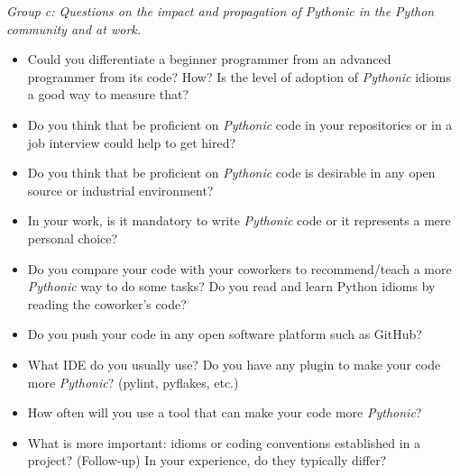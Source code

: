 \documentclass[a4paper]{article}
\begin{document}
\begin{appendices}
\textit{Group c: Questions on the impact and propagation of \textit{Pythonic} in the Python community and at work.}
\begin{itemize}
  \item Could you differentiate a beginner programmer from an advanced programmer from its code? How? Is the level of adoption of \textit{Pythonic} idioms a good way to measure that?
  \item Do you think that be proficient on \textit{Pythonic} code in your repositories or in a job interview could help to get hired?
  \item Do you think that be proficient on \textit{Pythonic} code is desirable in any open source or industrial environment?
  \item In your work, is it mandatory to write \textit{Pythonic} code or it represents a mere personal choice?
  \item Do you compare your code with your coworkers to recommend/teach a more \textit{Pythonic} way to do some tasks? Do you read and learn Python idioms by reading the coworker's code?
  \item Do you push your code in any open software platform such as GitHub? 
  \item What IDE do you usually use? Do you have any plugin to make your code more \textit{Pythonic}? (pylint, pyflakes, etc.)
  \item How often will you use a tool that can make your code more \textit{Pythonic}?
  \item What is more important: idioms or coding conventions established in a project?
  (Follow-up) In your experience, do they typically differ?
\end{itemize}
\end{appendices}
\end{document}
